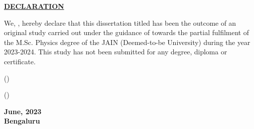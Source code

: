 
\thispagestyle{empty}

\begin{center}
\Large

\underline{\textbf{DECLARATION}}\\

\end{center}

\vspace{1.5cm}

\noindent
We, \textbf{\authone{}}, \textbf{\authtwo{}} hereby declare that this dissertation titled \textbf{\projectname} has been the outcome of an original study carried out under the guidance of \textbf{\guidename} towards
the partial fulfilment of the M.Sc. Physics degree of the JAIN (Deemed-to-be University)
during the year 2023-2024. This study has not been submitted for any degree, diploma or
certificate.

\vspace{5cm}

\noindent
\begin{minipage}{0.5\textwidth}
\flushleft
(\authone)

\vspace{1.5cm}

(\authtwo)

\end{minipage}%
\begin{minipage}{0.5\textwidth}
\flushright

\textbf{June, 2023\\
Bengaluru}
\end{minipage}